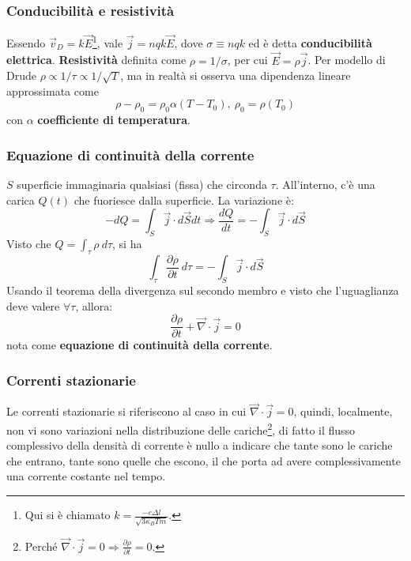 \documentclass[a4paper]{scrartcl}
\numberwithin{equation}{subsection}
\theoremstyle{style1}
\begin{document}
\subsubsection{Conducibilit\`a e resistivit\`a}

Essendo $\vec{v}_D = k \vec{E}$\footnote{Qui si \`e chiamato $k = \frac{-e \Delta l}{\sqrt{3\kappa _B T m } }$.}, vale $\vec{j}= nqk \vec{E}$, dove $\sigma \equiv nq k$ ed \`e detta \textbf{conducibilit\`a elettrica}. \textbf{Resistivit\`a} definita come $\rho = 1 / \sigma $, per cui $\vec{E} = \rho  \vec{j}$. Per modello di Drude $\rho  \propto 1 / \tau \propto 1 / \sqrt{T} $, ma in realt\`a si osserva una dipendenza lineare approssimata come
\begin{equation}
	\rho  - \rho_0 = \rho_0 \alpha  (T-T_0), \ \rho_0 = \rho (T_0)
\end{equation}
con $\alpha $ \textbf{coefficiente di temperatura}. 

\subsubsection{Equazione di continuit\`a della corrente}

$S$ superficie immaginaria qualsiasi (fissa) che circonda $\tau $. All'interno, c'\`e una carica $Q(t)$ che fuoriesce dalla superficie. La variazione \`e:
\begin{equation}
	-dQ = \int_{S} \vec{j}\cdot d\vec{S}dt \Rightarrow \frac{d Q}{d t} = - \int_{S} \vec{j}\cdot d\vec{S}
\end{equation}
Visto che $Q = \int_{\tau } \rho  \ d\tau $, si ha
\begin{equation}
	\int_{\tau } \frac{\partial \rho }{\partial t} \ d\tau = - \int_{S} \vec{j}\cdot d\vec{S}
\end{equation}
Usando il teorema della divergenza sul secondo membro e visto che l'uguaglianza deve valere $\forall \tau $, allora:
\begin{equation}
	\frac{\partial \rho }{\partial t}  + \vec{\nabla }\cdot \vec{j} = 0
\end{equation}
nota come \textbf{equazione di continuit\`a della corrente}.

\subsubsection{Correnti stazionarie}

Le correnti stazionarie si riferiscono al caso in cui $\vec{\nabla }\cdot  \vec{j} = 0$, quindi, localmente, non vi sono variazioni nella distribuzione delle cariche\footnote{Perch\'e $\vec{\nabla }\cdot \vec{j} = 0 \Rightarrow  \frac{\partial \rho }{\partial t}  = 0 $.}, di fatto il flusso complessivo della densit\`a di corrente \`e nullo a indicare che tante sono le cariche che entrano, tante sono quelle che escono, il che porta ad avere complessivamente una corrente costante nel tempo.
\end{document}
